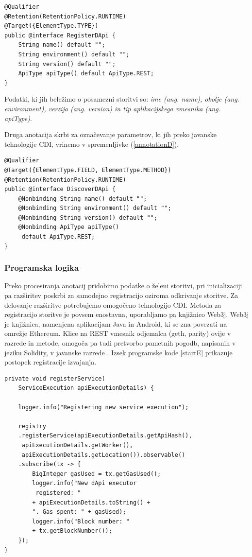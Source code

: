 \documentclass[a4paper, 12pt]{book}
\begin{document}
\begin{lstlisting}[caption={Anotacija za registracijo storitve},captionpos=b,label={annotationReg}]
@Qualifier
@Retention(RetentionPolicy.RUNTIME)
@Target({ElementType.TYPE})
public @interface RegisterDApi {
	String name() default "";
	String environment() default "";
	String version() default "";
	ApiType apiType() default ApiType.REST;
}
\end{lstlisting}

Podatki, ki jih beležimo o posamezni storitvi so: \textit{ime (ang. name), okolje (ang. environment), verzija (ang. version) in tip aplikacijskega vmesnika (ang. apiType)}.


Druga anotacija skrbi za označevanje parametrov, ki jih preko javanske tehnologije CDI, vrinemo v spremenljivke (\ref{annotationD}).

\begin{lstlisting}[caption={Anotacija za odkrivanje storitve},captionpos=b,label={annotationD}]
@Qualifier
@Target({ElementType.FIELD, ElementType.METHOD})
@Retention(RetentionPolicy.RUNTIME)
public @interface DiscoverDApi {
	@Nonbinding String name() default "";
	@Nonbinding String environment() default "";
	@Nonbinding String version() default "";
	@Nonbinding ApiType apiType()
	 default ApiType.REST;
}
\end{lstlisting}

\subsubsection{Programska logika}
Preko procesiranja anotacij pridobimo podatke o želeni storitvi, pri inicializaciji pa razširitev poskrbi za samodejno registracijo oziroma odkrivanje storitve.
Za delovanje razširitve potrebujemo omogočeno tehnologijo CDI.
Metoda za registracijo storitve je povsem enostavna, uporabljamo pa knjižnico Web3j.
Web3j je knjižnica, namenjena aplikacijam Java in Android, ki se zna povezati na omrežje Ethereum.
Klice na REST vmesnik odjemalca (geth, parity) ovije v razrede in metode, omogoča pa tudi pretvorbo pametnih pogodb, napisanih v jeziku Solidity, v javanske razrede \cite{web3j}.
Izsek programske kode \ref{startE} prikazuje postopek registracije izvajanja.

\begin{lstlisting}[caption={Funkcija za registracijo izvajanja storitve},captionpos=b,label={startE}]
private void registerService(
	ServiceExecution apiExecutionDetails) {
	
	logger.info("Registering new service execution");
	
	registry
	.registerService(apiExecutionDetails.getApiHash(),
	 apiExecutionDetails.getWorker(),
	 apiExecutionDetails.getLocation()).observable()
	.subscribe(tx -> {
		BigInteger gasUsed = tx.getGasUsed();
		logger.info("New dApi executor
		 registered: "
	 	+ apiExecutionDetails.toString() + 
	 	". Gas spent: " + gasUsed);
		logger.info("Block number: "
	 	+ tx.getBlockNumber());
	});
}
\end{lstlisting}
\end{document}
